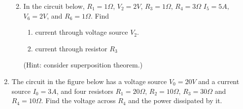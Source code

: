 \begin{enumerate}
\begin{enumerate}


\item In the circuit below, $R_1=1\Omega$, $V_2=2V$, $R_3=1\Omega$, $R_4=3\Omega$
$I_5=5A$, $V_6=2V$, and $R_6=1\Omega$. Find
\begin{enumerate}
\item current through voltage source $V_2$. 
\item current through resistor $R_3$
\end{enumerate}
(Hint: consider superposition theorem.)





\end{enumerate}


\item The circuit in the figure below has a voltage source $V_0=20V$ and a current 
source $I_0=3A$, and four resistors $R_1=20\Omega$, $R_2=10\Omega$, $R_3=30\Omega$ 
and $R_4=10\Omega$. Find the voltage across $R_4$ and the power dissipated by it.







\end{enumerate}
